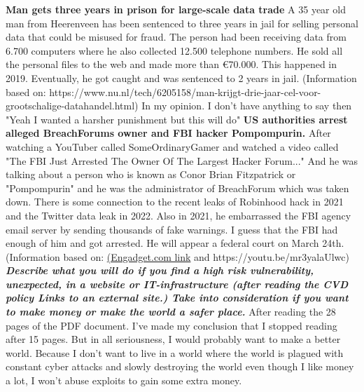 \documentclass[12pt, letterpaper]{article}
\begin{document}
\hfill\break
\hfill\break
\textbf{Man gets three years in prison for large-scale data trade}
\hfill\break
A 35 year old man from Heerenveen has been sentenced to three years in jail for selling personal data that could be misused for fraud.
The person had been receiving data from 6.700 computers where he also collected 12.500 telephone numbers. He sold all the personal files to the web and made more than €70.000. This happened in 2019. Eventually, he got caught and was sentenced to 2 years in jail. (Information based on: https://www.nu.nl/tech/6205158/man-krijgt-drie-jaar-cel-voor-grootschalige-datahandel.html)
\hfill\break
\hfill\break
In my opinion. I don't have anything to say then "Yeah I wanted a harsher punishment but this will do"
\hfill\break
\hfill\break
\textbf{\textbf{US authorities arrest alleged BreachForums owner and FBI hacker Pompompurin.}}
\hfill\break
After watching a YouTuber called SomeOrdinaryGamer and watched a video called "The FBI Just Arrested The Owner Of The Largest Hacker Forum..." And he was talking about a person who is known as Conor Brian Fitzpatrick or "Pompompurin" and he was the administrator of BreachForum which was taken down. There is some connection to the recent leaks of Robinhood hack in 2021 and the Twitter data leak in 2022. Also in 2021, he embarrassed the FBI agency email server by sending thousands of fake warnings. I guess that the FBI had enough of him and got arrested. He will appear a federal court on March 24th. (Information based on: \href{https://www.engadget.com/us-authorities-arrest-alleged-breachforums-owner-and-fbi-hacker-pompompurin-170009266.html?guccounter=1&guce_referrer=aHR0cHM6Ly9kdWNrZHVja2dvLmNvbS8&guce_referrer_sig=AQAAAEQpBy2kyPUw8ATdF7w0YnJKYmFnjlXQBih0kfhNxBKIz72UCOUpxu9292uBgp_UYr943Ch6jme-7qPjiaPoIvwA0tF3gzqrTQ53lsHHJLU7iIAFF4HlycLB-xIWOjEry79rP-CuyE__yIWz8JT8XhYLqHe6qQjX4liyn7WTZRug}{(Engadget.com link} and https://youtu.be/mr3yalaUlwc)
\hfill\break
\hfill\break
\textbf{\emph {Describe what you will do if you find a high risk vulnerability, unexpected, in a website or IT-infrastructure (after reading the CVD policy Links to an external site.) Take into consideration if you want to make money or make the world a safer place.}}
\hfill\break
\hfill\break
After reading the 28 pages of the PDF document. I've made my conclusion that I stopped reading after 15 pages. But in all seriousness, I would probably want to make a better world. Because I don't want to live in a world where the world is plagued with constant cyber attacks and slowly destroying the world even though I like money a lot, I won't abuse exploits to gain some extra money.
\end{document}
